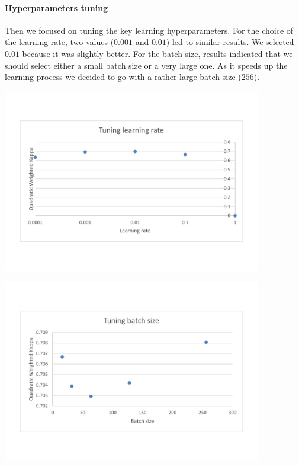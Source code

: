 \documentclass[a4paper,12pt,english]{article}
\begin{document}
\paragraph{Hyperparameters tuning} Then we focused on tuning the key learning hyperparameters. For the choice of the learning rate, two values ($0.001$ and $0.01$) led to similar results. We selected $0.01$ because it was slightly better. For the batch size, results indicated that we should select either a small batch size or a very large one. As it speeds up the learning process we decided to go with a rather large batch size ($256$).

\begin{center}
\vspace*{-1.5cm}
\includegraphics[width=0.85\textwidth]{fig/tune_lr.pdf}
\vspace*{-1.5cm}
\end{center}

\begin{center}
\vspace*{-1.5cm}
\includegraphics[width=0.85\textwidth]{fig/tune_bs.pdf}
\vspace*{-1.5cm}
\end{center}
\end{document}
